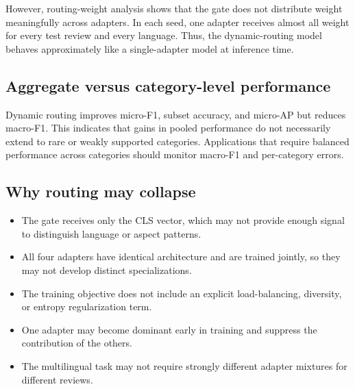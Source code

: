 \documentclass[review,12pt]{elsarticle}
\begin{document}
However, routing-weight analysis shows that the gate does not distribute weight meaningfully across adapters. In each seed, one adapter receives almost all weight for every test review and every language. Thus, the dynamic-routing model behaves approximately like a single-adapter model at inference time.

\subsection{Aggregate versus category-level performance}
Dynamic routing improves micro-F1, subset accuracy, and micro-AP but reduces macro-F1. This indicates that gains in pooled performance do not necessarily extend to rare or weakly supported categories. Applications that require balanced performance across categories should monitor macro-F1 and per-category errors.

\subsection{Why routing may collapse}
\begin{itemize}
\item The gate receives only the CLS vector, which may not provide enough signal to distinguish language or aspect patterns.
\item All four adapters have identical architecture and are trained jointly, so they may not develop distinct specializations.
\item The training objective does not include an explicit load-balancing, diversity, or entropy regularization term.
\item One adapter may become dominant early in training and suppress the contribution of the others.
\item The multilingual task may not require strongly different adapter mixtures for different reviews.
\end{itemize}
\end{document}
